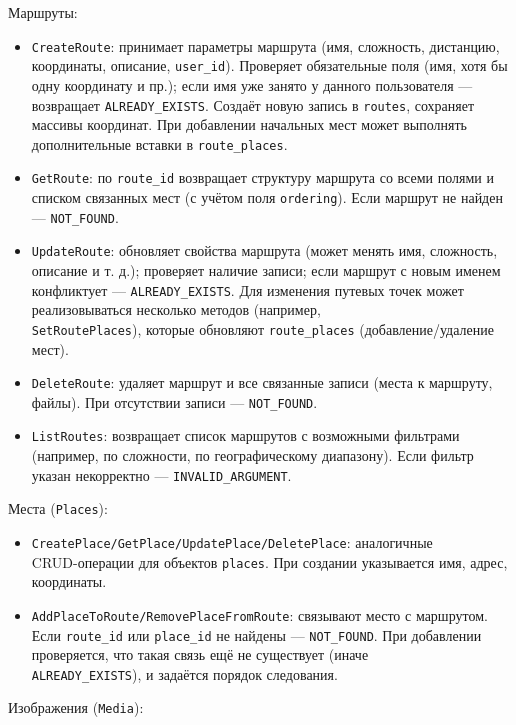 Маршруты:
\begin{itemize}
    \item \texttt{CreateRoute}: принимает параметры маршрута (имя, сложность, дистанцию, координаты, описание, \texttt{user\_id}). Проверяет обязательные поля (имя, хотя бы одну координату и пр.); если имя уже занято у данного пользователя — возвращает \texttt{ALREADY\_EXISTS}. Создаёт новую запись в \texttt{routes}, сохраняет массивы координат. При добавлении начальных мест может выполнять дополнительные вставки в \texttt{route\_places}.
    \item \texttt{GetRoute}: по \texttt{route\_id} возвращает структуру маршрута со всеми полями и списком связанных мест (с учётом поля \texttt{ordering}). Если маршрут не найден — \texttt{NOT\_FOUND}.
    \item \texttt{UpdateRoute}: обновляет свойства маршрута (может менять имя, сложность, описание и т. д.); проверяет наличие записи; если маршрут с новым именем конфликтует — \texttt{ALREADY\_EXISTS}. Для изменения путевых точек может реализовываться несколько методов (например, \\ \texttt{SetRoutePlaces}), которые обновляют \texttt{route\_places} (добавление/удаление мест).
    \item \texttt{DeleteRoute}: удаляет маршрут и все связанные записи (места к маршруту, файлы). При отсутствии записи — \texttt{NOT\_FOUND}.
    \item \texttt{ListRoutes}: возвращает список маршрутов с возможными фильтрами (например, по сложности, по географическому диапазону). Если фильтр указан некорректно — \texttt{INVALID\_ARGUMENT}.
\end{itemize}
Места (\texttt{Places}):
\begin{itemize}
    \item \texttt{CreatePlace/GetPlace/UpdatePlace/DeletePlace}: аналогичные \\ CRUD-операции для объектов \texttt{places}. При создании указывается имя, адрес, координаты.
    \item \texttt{AddPlaceToRoute/RemovePlaceFromRoute}: связывают место с маршрутом. Если \texttt{route\_id} или \texttt{place\_id} не найдены — \texttt{NOT\_FOUND}. При добавлении проверяется, что такая связь ещё не существует (иначе \\ \texttt{ALREADY\_EXISTS}), и задаётся порядок следования.
\end{itemize}
Изображения (\texttt{Media}):
